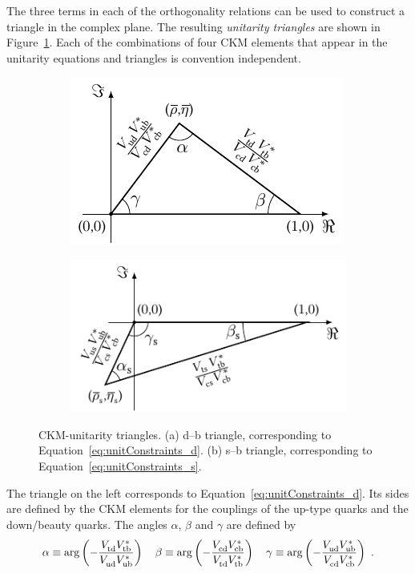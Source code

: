 The three terms in each of the orthogonality relations can be used to construct a triangle in the complex plane. The resulting
\emph{unitarity triangles} are shown in Figure~\ref{fig:unitTriangles}. Each of the combinations of four CKM elements that appear in the
unitarity equations and triangles is convention independent.
\begin{figure}[tb]
  \centering
  \begin{subfigure}{0.475\textwidth}
    \raggedright
    \includegraphics{graphics/intro/tikz/b-d-triangle}
    \caption{}
  \end{subfigure}%
  \begin{subfigure}{0.525\textwidth}
    \raggedleft
    \includegraphics{graphics/intro/tikz/b-s-triangle}
    \caption{}
  \end{subfigure}
  \caption{CKM-unitarity triangles. (a) d--b triangle, corresponding to Equation~\ref{eq:unitConstraints_d}. (b) s--b triangle,
           corresponding to Equation~\ref{eq:unitConstraints_s}.}
  \label{fig:unitTriangles}
\end{figure}

The triangle on the left corresponds to Equation~\ref{eq:unitConstraints_d}. Its sides are defined by the CKM elements for the couplings of
the up-type quarks and the down/beauty quarks. The angles $\alpha$, $\beta$ and $\gamma$ are defined by
\begin{equation}
  \alpha \equiv \arg\left( -\frac{\Vtd\Vtb[*]}{\Vud\Vub[*]} \right)
  \quad
  \beta  \equiv \arg\left( -\frac{\Vcd\Vcb[*]}{\Vtd\Vtb[*]} \right)
  \quad
  \gamma \equiv \arg\left( -\frac{\Vud\Vub[*]}{\Vcd\Vcb[*]} \right)
  \ .
\end{equation}

